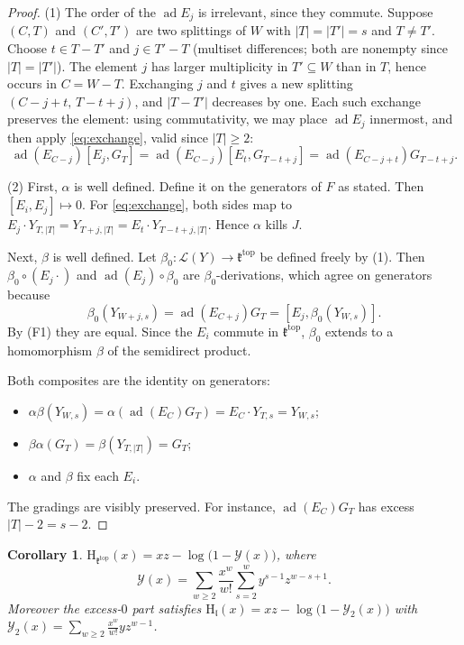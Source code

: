 \documentclass[11pt]{amsart}
\newtheorem{corollary}[theorem]{Corollary}
\theoremstyle{definition}
\theoremstyle{remark}
\newcommand{\lie}{\mathfrak{l}}
\newcommand{\ktop}{\mathfrak{k}^{\mathrm{top}}}
\newcommand{\Lf}{\mathcal{L}}
\newcommand{\ad}{\operatorname{ad}}
\newcommand{\Hs}{\mathrm{H}}
\begin{document}
\begin{proof}
(1) The order of the $\ad E_j$ is irrelevant, since they commute. Suppose $(C,T)$ and $(C',T')$ are two splittings of $W$ with $|T|=|T'|=s$ and $T\neq T'$. Choose $t\in T-T'$ and $j\in T'-T$ (multiset differences; both are nonempty since $|T|=|T'|$). The element $j$ has larger multiplicity in $T'\subseteq W$ than in $T$, hence occurs in $C=W-T$. Exchanging $j$ and $t$ gives a new splitting $(C-j+t,\,T-t+j)$, and $|T-T'|$ decreases by one. Each such exchange preserves the element: using commutativity, we may place $\ad E_j$ innermost, and then apply \eqref{eq:exchange}, valid since $|T|\ge2$:
\[
\ad(E_{C-j})[E_j,G_T]=\ad(E_{C-j})[E_t,G_{T-t+j}]=\ad(E_{C-j+t})G_{T-t+j}.
\]

(2) First, $\alpha$ is well defined. Define it on the generators of $F$ as stated. Then $[E_i,E_j]\mapsto0$. For \eqref{eq:exchange}, both sides map to $E_j\cdot Y_{T,|T|}=Y_{T+j,|T|}=E_t\cdot Y_{T-t+j,|T|}$. Hence $\alpha$ kills $J$.

Next, $\beta$ is well defined. Let $\beta_0\colon\Lf(Y)\to\ktop$ be defined freely by (1). Then $\beta_0\circ(E_j\cdot)$ and $\ad(E_j)\circ\beta_0$ are $\beta_0$-derivations, which agree on generators because
\[
\beta_0(Y_{W+j,s})=\ad(E_{C+j})G_T=[E_j,\beta_0(Y_{W,s})].
\]
By (F1) they are equal. Since the $E_i$ commute in $\ktop$, $\beta_0$ extends to a homomorphism $\beta$ of the semidirect product.

Both composites are the identity on generators:
\begin{itemize}
\item $\alpha\beta(Y_{W,s})=\alpha(\ad(E_{C})G_T)=E_{C}\cdot Y_{T,s}=Y_{W,s}$;
\item $\beta\alpha(G_T)=\beta(Y_{T,|T|})=G_T$;
\item $\alpha$ and $\beta$ fix each $E_i$.
\end{itemize}
The gradings are visibly preserved. For instance, $\ad(E_{C})G_T$ has excess $|T|-2=s-2$.
\end{proof}

\begin{corollary}\label{cor:ktopseries}
$\Hs_{\ktop}(x)=xz-\log\big(1-\mathcal Y(x)\big)$, where
\[
\mathcal Y(x)=\sum_{w\ge2}\frac{x^w}{w!}\sum_{s=2}^{w}y^{s-1}z^{w-s+1}.
\]
Moreover the excess-$0$ part satisfies $\Hs_{\lie}(x)=xz-\log\big(1-\mathcal Y_2(x)\big)$ with $\mathcal Y_2(x)=\sum_{w\ge2}\frac{x^w}{w!}yz^{w-1}$.
\end{corollary}
\end{document}
